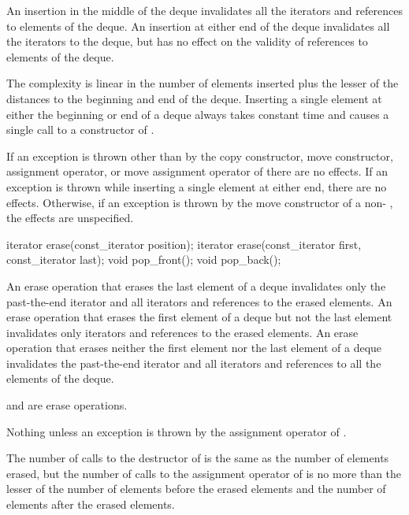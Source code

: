 \begin{itemdescr}
\pnum
\effects
An insertion in the middle of the deque invalidates all the iterators and
references to elements of the deque.
An insertion at either end of the
deque invalidates all the iterators to the deque, but has no effect on
the validity of references to elements of the deque.

\pnum
\complexity
The complexity is linear in the number of elements inserted plus the lesser
of the distances to the beginning and end of the deque.
Inserting a single element at either the beginning or end of a deque always takes constant time
and causes a single call to a constructor of
.

\pnum
\remarks
If an exception is thrown other than by the
copy constructor, move constructor,
assignment operator, or move assignment operator of
there are no effects.
If an exception is thrown while inserting a single element at either end,
there are no effects.
Otherwise, if an exception is thrown by the move constructor of a
non-
, the effects are unspecified.
\end{itemdescr}

%
\begin{itemdecl}
iterator erase(const_iterator position);
iterator erase(const_iterator first, const_iterator last);
void pop_front();
void pop_back();
\end{itemdecl}

\begin{itemdescr}
\pnum
\effects
An erase operation that erases the last element of a deque invalidates only the past-the-end iterator
and all iterators and references to the erased elements. An erase operation that erases the first
element of a deque but not the last element invalidates only iterators
and references to the erased elements. An erase operation
that erases neither the first element nor the last element of a deque invalidates the past-the-end
iterator and all iterators and references to all the elements of the deque.
\begin{note}
 and  are erase operations.
\end{note}

\pnum
\throws
Nothing unless an exception is thrown by the assignment operator of
.

\pnum
\complexity
The number of calls to the destructor of  is the same as the
number of elements erased, but the number of calls to the assignment operator of  is
no more than the lesser of the number of elements before the erased elements and the number of elements after the erased elements.
\end{itemdescr}

